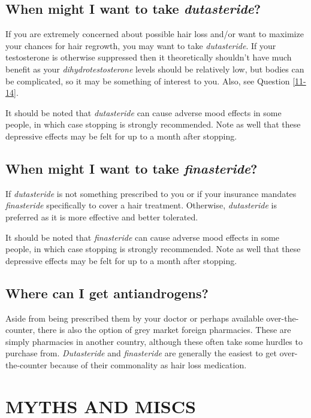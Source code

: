 \documentclass{article}
\begin{document}
\subsection{When might I want to take \textit{dutasteride}?}

If you are extremely concerned about possible hair loss and/or want to maximize your chances for hair regrowth, you may want to take \textit{dutasteride}. If your testosterone is otherwise suppressed then it theoretically shouldn’t have much benefit as your \textit{dihydrotestosterone} levels should be relatively low, but bodies can be complicated, so it may be something of interest to you. Also, see Question \ref{11-14}.

It should be noted that \textit{dutasteride} can cause adverse mood effects in some people, in which case stopping is strongly recommended. Note as well that these depressive effects may be felt for up to a month after stopping. 

\subsection{When might I want to take \textit{finasteride}?}

If \textit{dutasteride }is not something prescribed to you or if your insurance mandates \textit{finasteride} specifically to cover a hair treatment. Otherwise, \textit{dutasteride} is preferred as it is more effective and better tolerated.

It should be noted that \textit{finasteride} can cause adverse mood effects in some people, in which case stopping is strongly recommended. Note as well that these depressive effects may be felt for up to a month after stopping.

\subsection{Where can I get antiandrogens?}

Aside from being prescribed them by your doctor or perhaps available over-the-counter, there is also the option of grey market foreign pharmacies. These are simply pharmacies in another country, although these often take some hurdles to purchase from. \textit{Dutasteride} and \textit{finasteride }are generally the easiest to get over-the-counter because of their commonality as hair loss medication.

 

\section{MYTHS AND MISCS}\label{MM}
\end{document}
